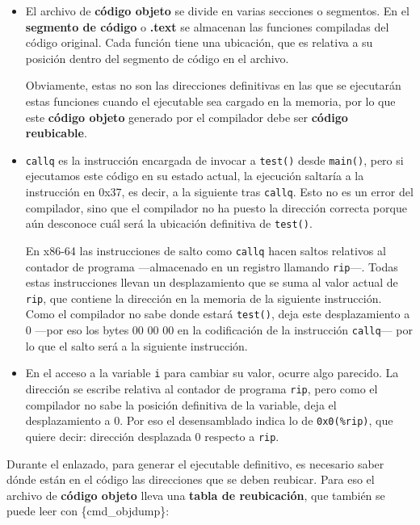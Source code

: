 \begin{itemize}
\item
  El archivo de \textbf{código objeto} se divide en varias secciones o
  segmentos. En el \textbf{segmento de código}{} o \textbf{.text}{} se
  almacenan las funciones compiladas del código original. Cada función
  tiene una ubicación, que es relativa a su posición dentro del segmento
  de código en el archivo.

  Obviamente, estas no son las direcciones definitivas en las que se
  ejecutarán estas funciones cuando el ejecutable sea cargado en la
  memoria, por lo que este \textbf{código objeto} generado por el
  compilador debe ser \textbf{código reubicable}.
\item
  \texttt{callq} es la instrucción encargada de invocar a
  \texttt{test()} desde \texttt{main()}, pero si ejecutamos este código
  en su estado actual, la ejecución saltaría a la instrucción en 0x37,
  es decir, a la siguiente tras \texttt{callq}. Esto no es un error del
  compilador, sino que el compilador no ha puesto la dirección correcta
  porque aún desconoce cuál será la ubicación definitiva de
  \texttt{test()}.

  En x86-64 las instrucciones de salto como \texttt{callq} hacen saltos
  relativos al contador de programa ---almacenado en un registro
  llamando \texttt{rip}---. Todas estas instrucciones llevan un
  desplazamiento que se suma al valor actual de \texttt{rip}, que
  contiene la dirección en la memoria de la siguiente instrucción. Como
  el compilador no sabe donde estará \texttt{test()}, deja este
  desplazamiento a 0 ---por eso los bytes  00 00
  00\textquotesingle{} en la codificación de la instrucción
  \texttt{callq}--- por lo que el salto será a la siguiente instrucción.
\item
  En el acceso a la variable \texttt{i} para cambiar su valor, ocurre
  algo parecido. La dirección se escribe relativa al contador de
  programa \texttt{rip}, pero como el compilador no sabe la posición
  definitiva de la variable, deja el desplazamiento a 0. Por eso el
  desensamblado indica lo de \texttt{0x0(\%rip)}, que quiere decir:
  dirección desplazada 0 respecto a \texttt{rip}.
\end{itemize}

Durante el enlazado, para generar el ejecutable definitivo, es necesario
saber dónde están en el código las direcciones que se deben reubicar.
Para eso el archivo de \textbf{código objeto} lleva una \textbf{tabla de
reubicación}, que también se puede leer con \{cmd\_objdump\}:

